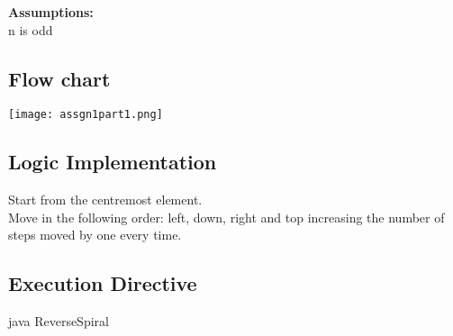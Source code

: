 \documentclass[paper=a4, fontsize=11pt]{scrartcl} %
\numberwithin{equation}{section} %
\numberwithin{figure}{section} %
\numberwithin{table}{section} %
\begin{document}
{\textbf {Assumptions:}}\\
n is odd

\newpage
\subsection{Flow chart}
 {\center\texttt{[image: assgn1part1.png]}}

\subsection{Logic Implementation}
Start from the centremost element.\\
Move in the following order: left, down, right and top increasing the number of steps moved by one every time.\\

\subsection{Execution Directive}
java ReverseSpiral
\end{document}
